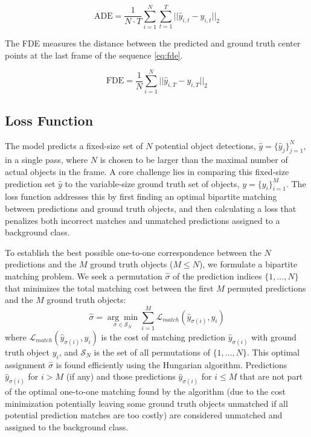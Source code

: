 \begin{equation}
    \text{ADE} = \frac{1}{N \cdot T} \sum_{i=1}^{N} \sum_{t=1}^{T} || \hat{y}_{i,t} - y_{i,t} ||_2
    \label{eq:ade}
\end{equation}

The FDE measures the distance between the predicted and ground truth center points at the last frame of the sequence \ref{eq:fde}.

\begin{equation}
    \text{FDE} = \frac{1}{N} \sum_{i=1}^{N} || \hat{y}_{i,T} - y_{i,T} ||_2
    \label{eq:fde}
\end{equation}

\subsection{Loss Function} \label{Methods:LossFunction}

The model predicts a fixed-size set of $N$ potential object detections, $ \hat{y} = \{\hat{y}_j\}_{j=1}^N $, in a single pass, where $N$ is chosen to be larger than the maximal number of actual objects in the frame. A core challenge lies in comparing this fixed-size prediction set $ \hat{y} $ to the variable-size ground truth set of objects, $ y = \{y_i\}_{i=1}^M $. The loss function addresses this by first finding an optimal bipartite matching between predictions and ground truth objects, and then calculating a loss that penalizes both incorrect matches and unmatched predictions assigned to a background class.

To establish the best possible one-to-one correspondence between the $N$ predictions and the $M$ ground truth objects ($M \le N$), we formulate a bipartite matching problem. We seek a permutation $ \hat{\sigma} $ of the prediction indices $ \{1, ..., N\} $ that minimizes the total matching cost between the first $M$ permuted predictions and the $M$ ground truth objects:
\begin{equation}
    \hat{\sigma} = \underset{\sigma \in \mathcal{S}_N}{\arg\min} \sum_{i=1}^M \mathcal{L}_{match}(\hat{y}_{\sigma(i)}, y_i)
    \label{eq:matching_argmin}
\end{equation}
where $ \mathcal{L}_{match}(\hat{y}_{\sigma(i)}, y_i) $ is the cost of matching prediction $ \hat{y}_{\sigma(i)} $ with ground truth object $ y_i $, and $ \mathcal{S}_N $ is the set of all permutations of $ \{1, ..., N\} $. This optimal assignment $ \hat{\sigma} $ is found efficiently using the Hungarian algorithm. Predictions $ \hat{y}_{\sigma(i)} $ for $ i > M $ (if any) and those predictions $ \hat{y}_{\sigma(i)} $ for $ i \le M $ that are not part of the optimal one-to-one matching found by the algorithm (due to the cost minimization potentially leaving some ground truth objects unmatched if all potential prediction matches are too costly) are considered unmatched and assigned to the background class.

